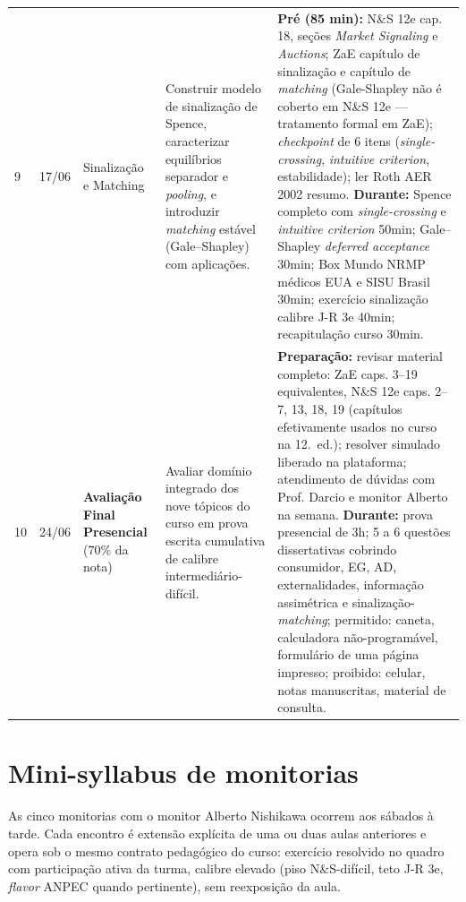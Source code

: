 \documentclass[11pt,a4paper]{article}
\newcommand{\zaeshort}{ZaE}
\newcommand{\ns}{N\&S 12e}
\newcommand{\jr}{J-R 3e}
\begin{document}
\begin{small}
\begin{longtable}{@{}p{0.9cm}p{1.6cm}p{2.8cm}p{4.2cm}p{4.6cm}@{}}
9 & 17/06 & Sinalização e Matching & Construir modelo de sinalização de Spence, caracterizar equilíbrios separador e \textit{pooling}, e introduzir \textit{matching} estável (Gale--Shapley) com aplicações. &
\textbf{Pré (85 min):} \ns{} cap. 18, seções \textit{Market Signaling} e \textit{Auctions}; \zaeshort{} capítulo de sinalização e capítulo de \textit{matching} (Gale-Shapley não é coberto em \ns{} --- tratamento formal em \zaeshort{}); \textit{checkpoint} de 6 itens (\textit{single-crossing}, \textit{intuitive criterion}, estabilidade); ler Roth AER 2002 resumo.\newline
\textbf{Durante:} Spence completo com \textit{single-crossing} e \textit{intuitive criterion} 50min; Gale--Shapley \textit{deferred acceptance} 30min; Box Mundo NRMP médicos EUA e SISU Brasil 30min; exercício sinalização calibre \jr{} 40min; recapitulação curso 30min. \\
\addlinespace

10 & 24/06 & \textbf{Avaliação Final Presencial} (70\% da nota) & Avaliar domínio integrado dos nove tópicos do curso em prova escrita cumulativa de calibre intermediário-difícil. &
\textbf{Preparação:} revisar material completo: \zaeshort{} caps. 3--19 equivalentes, \ns{} caps. 2--7, 13, 18, 19 (capítulos efetivamente usados no curso na 12.~ed.); resolver simulado liberado na plataforma; atendimento de dúvidas com Prof. Darcio e monitor Alberto na semana.\newline
\textbf{Durante:} prova presencial de 3h; 5 a 6 questões dissertativas cobrindo consumidor, EG, AD, externalidades, informação assimétrica e sinalização-\textit{matching}; permitido: caneta, calculadora não-programável, formulário de uma página impresso; proibido: celular, notas manuscritas, material de consulta. \\
\end{longtable}
\end{small}

\section{Mini-syllabus de monitorias}
\label{sec:monitorias}

As cinco monitorias com o monitor Alberto Nishikawa ocorrem aos sábados à tarde. Cada encontro é extensão explícita de uma ou duas aulas anteriores e opera sob o mesmo contrato pedagógico do curso: exercício resolvido no quadro com participação ativa da turma, calibre elevado (piso N\&S-difícil, teto \jr{}, \textit{flavor} ANPEC quando pertinente), sem reexposição da aula.
\end{document}
